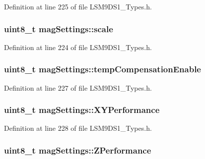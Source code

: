 Definition at line 225 of file L\+S\+M9\+D\+S1\+\_\+\+Types.\+h.

\subsubsection[{\texorpdfstring{scale}{scale}}]{\setlength{\rightskip}{0pt plus 5cm}uint8\+\_\+t mag\+Settings\+::scale}\hypertarget{structmag_settings_a5966915104376cb76d9eb787bab024bc}{}\label{structmag_settings_a5966915104376cb76d9eb787bab024bc}


Definition at line 224 of file L\+S\+M9\+D\+S1\+\_\+\+Types.\+h.

\subsubsection[{\texorpdfstring{temp\+Compensation\+Enable}{tempCompensationEnable}}]{\setlength{\rightskip}{0pt plus 5cm}uint8\+\_\+t mag\+Settings\+::temp\+Compensation\+Enable}\hypertarget{structmag_settings_afcfa1e532fa140e42dc34a4abd7926ae}{}\label{structmag_settings_afcfa1e532fa140e42dc34a4abd7926ae}


Definition at line 227 of file L\+S\+M9\+D\+S1\+\_\+\+Types.\+h.

\subsubsection[{\texorpdfstring{X\+Y\+Performance}{XYPerformance}}]{\setlength{\rightskip}{0pt plus 5cm}uint8\+\_\+t mag\+Settings\+::\+X\+Y\+Performance}\hypertarget{structmag_settings_ad36c7bb251858fb289841c91fb615a5f}{}\label{structmag_settings_ad36c7bb251858fb289841c91fb615a5f}


Definition at line 228 of file L\+S\+M9\+D\+S1\+\_\+\+Types.\+h.

\subsubsection[{\texorpdfstring{Z\+Performance}{ZPerformance}}]{\setlength{\rightskip}{0pt plus 5cm}uint8\+\_\+t mag\+Settings\+::\+Z\+Performance}\hypertarget{structmag_settings_a0ab41f0670a3fd20ce1a43332f6fe949}{}\label{structmag_settings_a0ab41f0670a3fd20ce1a43332f6fe949}


